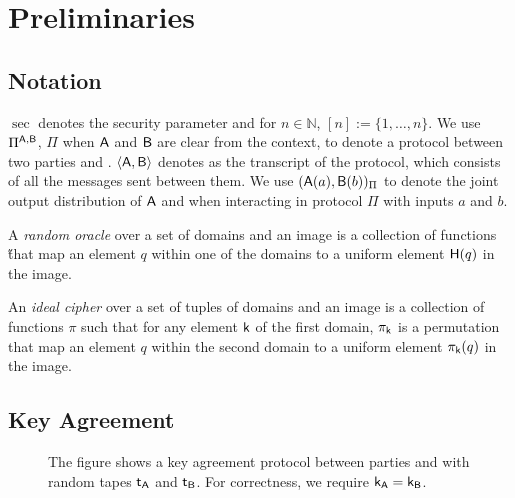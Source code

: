 \section{Preliminaries}

\subsection{Notation}
$\sec$ denotes the security parameter and for $n\in\mathbb N$, $[n]:=\{1,\dots,n\}$. We use $\Pi^{\mathsf{A},\mathsf{B}}$, $\Pi$ when $\mathsf{A}$ and $\mathsf{B}$ are clear from the context,  to denote a protocol between two parties \A and \B. $\langle \mathsf{A},\mathsf{B}\rangle$ denotes as the transcript of the protocol, which consists of all the messages sent between them. We use $(\mathsf{A}(a),\mathsf{B}(b))_{\Pi}$ to denote the joint output distribution of $\mathsf{A}$ and \B when interacting in protocol $\Pi$ with inputs $a$ and $b$.


\begin{definition}
A \emph{random oracle} over a set of domains and an image is a collection of functions \H that map an element $q$ within one of the domains  to a uniform element $\mathsf{H}(q)$ in the image.  
\end{definition}


\begin{definition}
An \emph{ideal cipher} over a set of tuples of domains and an image is a collection of functions $\pi$ such that for any element $\mathsf{k}$ of the first domain, $\pi_\mathsf{k}$ is a permutation that map an element $q$ within the second domain to a uniform element $\pi_{\mathsf{k}}(q)$ in the image.  
\end{definition}

\subsection{Key Agreement}

\begin{figure}[h!]
\centering
{}
\label{fig:UKA}
\caption{The figure shows a key agreement protocol between parties \A and \B with random tapes $\mathsf{t}_\mathsf{A}$ and $\mathsf{t}_\mathsf{B}$. For correctness, we require $\mathsf{k}_\mathsf{A}=\mathsf{k}_\mathsf{B}$.}
\end{figure}


